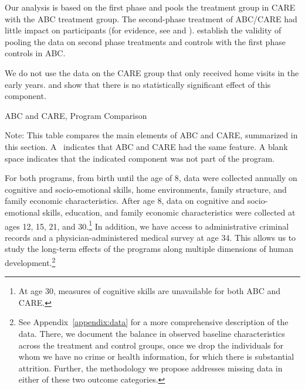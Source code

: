 Our analysis is based on the first phase and pools the treatment group in CARE with the ABC treatment group. The second-phase treatment of ABC/CARE had little impact on participants (for evidence, see \citealp{Campbell_Conti_etal_2014_EarlyChildhoodInvestments} and \citealp{ABCCARE_Dataset}). \citet{Campbell_Conti_etal_2014_EarlyChildhoodInvestments} establish the validity of pooling the data on second phase treatments and controls with the first phase controls in ABC.

We do not use the data on the CARE group that only received home visits in the early years. \citet{Campbell_Conti_etal_2014_EarlyChildhoodInvestments} and \citet{ABCCARE_Dataset} show that there is no statistically significant effect of this component.

\begin{table}[!htbp]
\centering
\caption{ABC and CARE, Program Comparison} \label{tab:programcomparison}
\begin{adjustbox}{max width=\textwidth}
\begin{threeparttable}
	\small
	
\begin{tablenotes}
\small
\item Note: This table compares the main elements of ABC and CARE, summarized in this section. A \checkmark\ indicates that ABC and CARE had the same feature. A blank space indicates that the indicated component was not part of the program.
\end{tablenotes}
\end{threeparttable}
\end{adjustbox}
\end{table}

For both programs, from birth until the age of 8, data were collected annually on cognitive and socio-emotional skills, home environments, family structure, and family economic characteristics. After age 8, data on cognitive and socio-emotional skills, education, and family economic characteristics were collected at ages 12, 15, 21, and 30.\footnote{At age 30, measures of cognitive skills are unavailable for both ABC and CARE.} In addition, we have access to administrative criminal records and a physician-administered medical survey at age 34. This allows us to study the long-term effects of the programs along multiple dimensions of human development.\footnote{See Appendix~\ref{appendix:data} for a more comprehensive description of the data. There, we document the balance in observed baseline characteristics across the treatment and control groups, once we drop the individuals for whom we have no crime or health information, for which there is substantial attrition. Further, the methodology we propose addresses missing data in either of these two outcome categories.}

